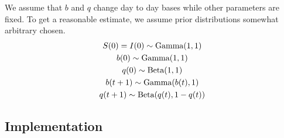 \documentclass{article}
\begin{document}
We assume that $b$ and $q$ change day to day bases while other parameters are fixed.
To get a reasonable estimate, we assume prior distributions somewhat arbitrary chosen.
\begin{gather}
    S(0) = I(0) \sim \textup{Gamma}(1, 1)\\
    b(0) \sim \textup{Gamma}(1, 1)\\
    q(0) \sim \textup{Beta}(1, 1)\\
    b(t+1) \sim \textup{Gamma}(b(t), 1)\\
    q(t+1) \sim \textup{Beta}(q(t), 1-q(t))
\end{gather}

\subsection{Implementation}



\end{document}
